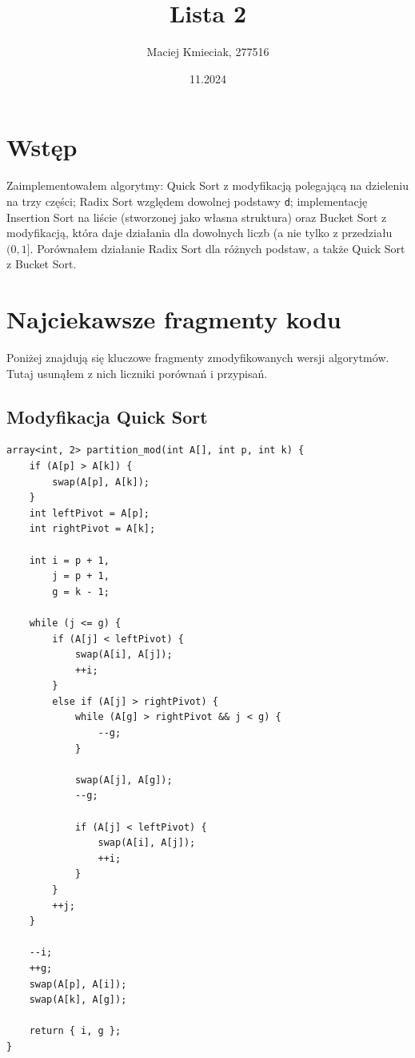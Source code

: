 \documentclass{article}
\title{Lista 2}
\author{Maciej Kmieciak, 277516}
\date{11.2024}
\begin{document}
\maketitle

\section{Wstęp}

Zaimplementowałem algorytmy: Quick Sort z modyfikacją polegającą na dzieleniu na trzy części; Radix Sort względem dowolnej podstawy \texttt{d}; implementację Insertion Sort na liście (stworzonej jako własna struktura) oraz Bucket Sort z modyfikacją, która daje działania dla dowolnych liczb (a nie tylko z przedziału \((0, 1]\). Porównałem działanie Radix Sort dla różnych podstaw, a także Quick Sort z Bucket Sort.

\section{Najciekawsze fragmenty kodu}

Poniżej znajdują się kluczowe fragmenty zmodyfikowanych wersji algorytmów. Tutaj usunąłem z nich liczniki porównań i przypisań.

\subsection{Modyfikacja Quick Sort}

\begin{verbatim}
array<int, 2> partition_mod(int A[], int p, int k) {
    if (A[p] > A[k]) {
        swap(A[p], A[k]);
    }
    int leftPivot = A[p];
    int rightPivot = A[k];

    int i = p + 1,
        j = p + 1,
        g = k - 1;

    while (j <= g) {
        if (A[j] < leftPivot) {
            swap(A[i], A[j]);
            ++i;
        }
        else if (A[j] > rightPivot) {
            while (A[g] > rightPivot && j < g) {
                --g;
            }
            
            swap(A[j], A[g]);
            --g;

            if (A[j] < leftPivot) {
                swap(A[i], A[j]);
                ++i;
            }
        }
        ++j;
    }
    
    --i;
    ++g;
    swap(A[p], A[i]);
    swap(A[k], A[g]);

    return { i, g };
}
\end{verbatim}
\end{document}
